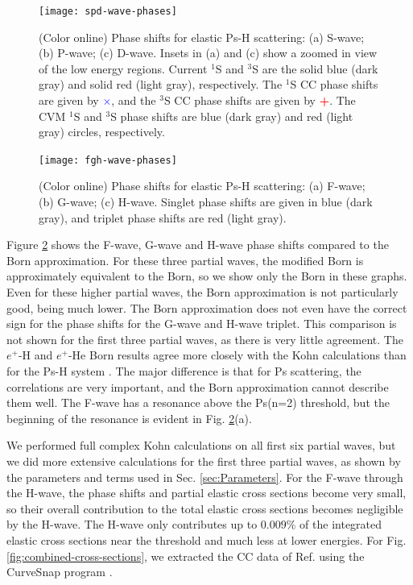\documentclass[reprint,showpacs,preprintnumbers,amsmath,amssymb,pra,aps]{revtex4-1}
\begin{document}
\begin{figure}[H]
	\centering
	\texttt{[image: spd-wave-phases]}
	\caption{(Color online) Phase shifts for elastic Ps-H scattering: (a) S-wave; (b) P-wave; (c) D-wave. Insets in (a) and (c) show a zoomed in view of the low energy regions. Current $^1$S and $^3$S are the solid blue (dark gray) and solid red (light gray), respectively. The $^1$S CC phase shifts \cite{Walters2004} are given by \mbox{\textcolor{blue}{$\times$}}, and the $^3$S CC phase shifts \cite{Blackwood2002} are given by \mbox{\textcolor{red}{\textbf{+}}}. The CVM $^1$S and $^3$S phase shifts \cite{Zhang2012} are blue (dark gray) and red (light gray) circles, respectively.}
	\label{fig:spd-wave-phases}
\end{figure}

\begin{figure}[H]
	\centering
	\texttt{[image: fgh-wave-phases]}
	\caption{(Color online) Phase shifts for elastic Ps-H scattering: (a) F-wave; (b) G-wave; (c) H-wave. Singlet phase shifts are given in blue (dark gray), and triplet phase shifts are red (light gray).}
	\label{fig:fgh-wave-phases}
\end{figure}

Figure \ref{fig:fgh-wave-phases} shows the F-wave, G-wave and H-wave phase shifts compared to the Born approximation. For these three partial waves, the modified Born is approximately equivalent to the Born, so we show only the Born in these graphs. Even for these higher partial waves, the Born approximation is not particularly good, being much lower. The Born approximation does not even have the correct sign for the phase shifts for the G-wave and H-wave triplet. This comparison is not shown for the first three partial waves, as there is very little agreement. The $e^+$-H and $e^+$-He Born results agree more closely with the Kohn calculations than for the Ps-H system \cite{?}. The major difference is that for Ps scattering, the correlations are very important, and the Born approximation cannot describe them well. The F-wave has a resonance above the Ps(n=2) threshold, but the beginning of the resonance is evident in Fig. \ref{fig:fgh-wave-phases}(a).

We performed full complex Kohn calculations on all first six partial waves, but we did more extensive calculations for the first three partial waves, as shown by the parameters and terms used in Sec. \ref{sec:Parameters}. For the F-wave through the H-wave, the phase shifts and partial elastic cross sections become very small, so their overall contribution to the total elastic cross sections becomes negligible by the H-wave. The H-wave only contributes up to $0.009\%$ of the integrated elastic cross sections near the threshold and much less at lower energies. For Fig. \ref{fig:combined-cross-sections}, we extracted the CC data of Ref. \cite{Walters2004} using the CurveSnap program \cite{CurveSnap}.
\end{document}
